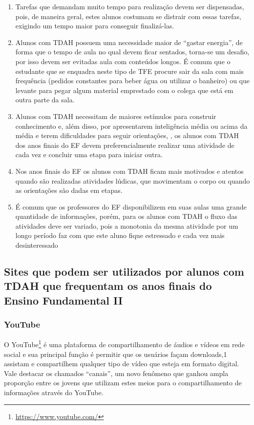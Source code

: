 \documentclass{textolivre}
\begin{document}
\begin{enumerate}[label={\alph*}]
    \item Tarefas que demandam muito tempo para realização devem ser dispensadas, pois, de maneira geral, estes alunos costumam se distrair com essas tarefas, exigindo um tempo maior para conseguir finalizá-las.
    \item Alunos com TDAH possuem uma necessidade maior de “gastar energia”, de forma que o tempo de aula no qual devem ficar sentados, torna-se um desafio, por isso devem ser evitadas aula com conteúdos longos.  É comum que o estudante que se enquadra neste tipo de TFE procure sair da sala com mais frequência (pedidos constantes para beber água ou utilizar o banheiro) ou que levante para pegar algum material emprestado com o colega que está em outra parte da sala.
    \item Alunos com TDAH necessitam de maiores estímulos para construir conhecimento e, além disso, por apresentarem inteligência média ou acima da média e terem dificuldades para seguir orientações, \textcite{rohde_transtorno_1999}, os alunos com TDAH dos anos finais do EF devem preferencialmente realizar uma atividade de cada vez e concluir uma etapa para iniciar outra.
    \item Nos anos finais do EF os alunos com TDAH ficam mais motivados e atentos quando são realizadas atividades lúdicas, que movimentam o corpo ou quando as orientações são dadas em etapas.
    \item É comum que os professores do EF disponibilizem em suas aulas uma grande quantidade de informações, porém, para os alunos com TDAH o fluxo das atividades deve ser variado, pois a monotonia da mesma atividade por um longo período faz com que este aluno fique estressado e cada vez mais desinteressado 
\end{enumerate}

\subsection{Sites que podem ser utilizados por alunos com TDAH que frequentam os anos finais do Ensino Fundamental II}\label{sec-sites}

\subsubsection{YouTube}\label{sec-youtube}
O YouTube\footnote{\url{https://www.youtube.com/}} é uma plataforma de compartilhamento de áudios e vídeos em rede social e sua principal função é permitir que os usuários façam downloads,1 assistam e compartilhem qualquer tipo de vídeo que esteja em formato digital. Vale destacar os chamados “canais”, um novo fenômeno que ganhou ampla proporção entre os jovens que utilizam estes meios para o compartilhamento de informações através do YouTube. 
\end{document}
